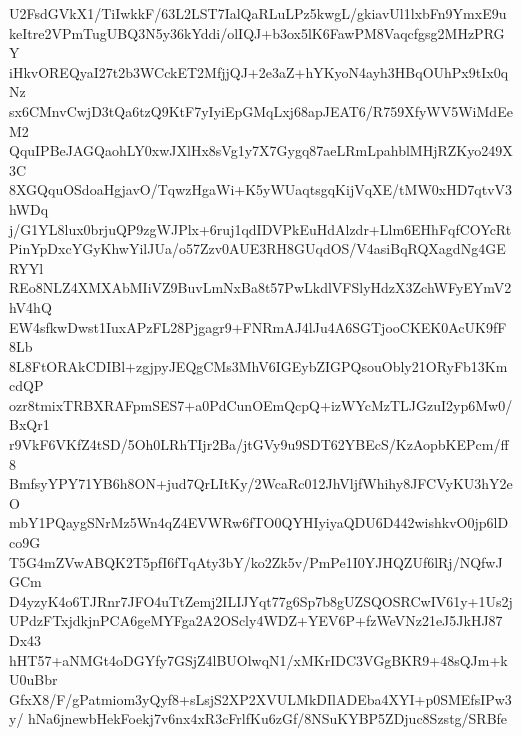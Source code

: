 U2FsdGVkX1/TiIwkkF/63L2LST7IalQaRLuLPz5kwgL/gkiavUl1lxbFn9YmxE9u
keItre2VPmTugUBQ3N5y36kYddi/olIQJ+b3ox5lK6FawPM8Vaqcfgsg2MHzPRGY
iHkvOREQyaI27t2b3WCckET2MfjjQJ+2e3aZ+hYKyoN4ayh3HBqOUhPx9tIx0qNz
sx6CMnvCwjD3tQa6tzQ9KtF7yIyiEpGMqLxj68apJEAT6/R759XfyWV5WiMdEeM2
QquIPBeJAGQaohLY0xwJXlHx8sVg1y7X7Gygq87aeLRmLpahblMHjRZKyo249X3C
8XGQquOSdoaHgjavO/TqwzHgaWi+K5yWUaqtsgqKijVqXE/tMW0xHD7qtvV3hWDq
j/G1YL8lux0brjuQP9zgWJPlx+6ruj1qdIDVPkEuHdAlzdr+Llm6EHhFqfCOYcRt
PinYpDxcYGyKhwYilJUa/o57Zzv0AUE3RH8GUqdOS/V4asiBqRQXagdNg4GERYYl
REo8NLZ4XMXAbMIiVZ9BuvLmNxBa8t57PwLkdlVFSlyHdzX3ZchWFyEYmV2hV4hQ
EW4sfkwDwst1IuxAPzFL28Pjgagr9+FNRmAJ4lJu4A6SGTjooCKEK0AcUK9fF8Lb
8L8FtORAkCDIBl+zgjpyJEQgCMs3MhV6IGEybZIGPQsouObly21ORyFb13KmcdQP
ozr8tmixTRBXRAFpmSES7+a0PdCunOEmQcpQ+izWYcMzTLJGzuI2yp6Mw0/BxQr1
r9VkF6VKfZ4tSD/5Oh0LRhTIjr2Ba/jtGVy9u9SDT62YBEcS/KzAopbKEPcm/ff8
BmfsyYPY71YB6h8ON+jud7QrLItKy/2WcaRc012JhVljfWhihy8JFCVyKU3hY2eO
mbY1PQaygSNrMz5Wn4qZ4EVWRw6fTO0QYHIyiyaQDU6D442wishkvO0jp6lDco9G
T5G4mZVwABQK2T5pfI6fTqAty3bY/ko2Zk5v/PmPe1I0YJHQZUf6lRj/NQfwJGCm
D4yzyK4o6TJRnr7JFO4uTtZemj2ILIJYqt77g6Sp7b8gUZSQOSRCwIV61y+1Us2j
UPdzFTxjdkjnPCA6geMYFga2A2OScly4WDZ+YEV6P+fzWeVNz21eJ5JkHJ87Dx43
hHT57+aNMGt4oDGYfy7GSjZ4lBUOlwqN1/xMKrIDC3VGgBKR9+48sQJm+kU0uBbr
GfxX8/F/gPatmiom3yQyf8+sLsjS2XP2XVULMkDIlADEba4XYI+p0SMEfsIPw3y/
hNa6jnewbHekFoekj7v6nx4xR3cFrlfKu6zGf/8NSuKYBP5ZDjuc8Szstg/SRBfe
